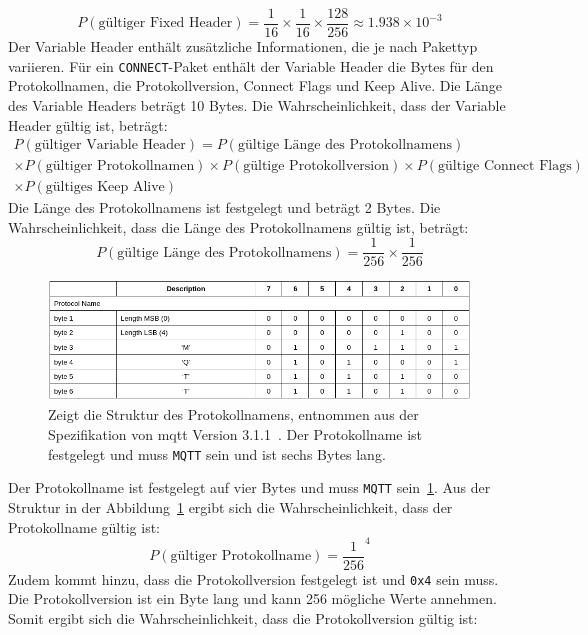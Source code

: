 \[
    P(\text{gültiger Fixed Header}) = \frac{1}{16} \times \frac{1}{16} \times \frac{128}{256} \approx 1.938 \times 10^{-3}
\]
Der Variable Header enthält zusätzliche Informationen, die je nach Pakettyp variieren.
Für ein \texttt{CONNECT}-Paket enthält der Variable Header die Bytes für den Protokollnamen, die Protokollversion, Connect Flags
und Keep Alive.
Die Länge des Variable Headers beträgt 10 Bytes.
Die Wahrscheinlichkeit, dass der Variable Header gültig ist, beträgt:
\begin{multline}
    P(\text{gültiger Variable Header}) = P(\text{gültige Länge des Protokollnamens}) \\
    \times P(\text{gültiger Protokollnamen}) \times P(\text{gültige Protokollversion}) \times P(\text{gültige Connect Flags}) \\
    \times P(\text{gültiges Keep Alive})
\end{multline}
Die Länge des Protokollnamens ist festgelegt und beträgt 2 Bytes.
Die Wahrscheinlichkeit, dass die Länge des Protokollnamens gültig ist, beträgt:
\[
    P(\text{gültige Länge des Protokollnamens}) = \frac{1}{256} \times \frac{1}{256}
\]
\begin{figure}[H]
    \centering
    \includegraphics[width=\textwidth]{img/mqtt_prot_name}
    \caption[Struktur des Protokollnamens in einem \gls{mqtt}-Paket]{Zeigt die Struktur des Protokollnamens, entnommen aus der Spezifikation von \gls{mqtt} Version 3.1.1~\cite{mqtt-variable-header}.
        Der Protokollname ist festgelegt und muss \texttt{MQTT} sein und ist sechs Bytes lang.}
    \label{fig:mqtt_prot_name}
\end{figure}
Der Protokollname ist festgelegt auf vier Bytes und muss \texttt{MQTT} sein~\ref{fig:mqtt_prot_name}.
Aus der Struktur in der Abbildung~\ref{fig:mqtt_prot_name} ergibt sich die Wahrscheinlichkeit, dass der Protokollname gültig ist:
\[
    P(\text{gültiger Protokollname}) = \frac{1}{256}^4
\]
Zudem kommt hinzu, dass die Protokollversion festgelegt ist und \texttt{0x4} sein muss.
Die Protokollversion ist ein Byte lang und kann 256 mögliche Werte annehmen.
Somit ergibt sich die Wahrscheinlichkeit, dass die Protokollversion gültig ist:
